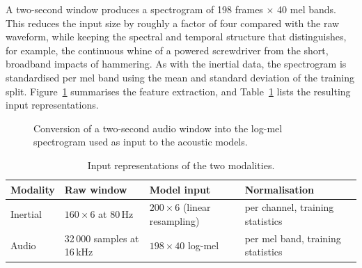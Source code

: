 A two-second window produces a spectrogram of 198 frames $\times$ 40 mel bands.
This reduces the input size by roughly a factor of four compared with the raw
waveform, while keeping the spectral and temporal structure that distinguishes,
for example, the continuous whine of a powered screwdriver from the short,
broadband impacts of hammering. As with the inertial data, the spectrogram is
standardised per mel band using the mean and standard deviation of the training
split. Figure~\ref{fig:logmel} summarises the feature extraction, and
Table~\ref{tab:inputs} lists the resulting input representations.

\begin{figure}[htbp]
\centering
{}
\caption{Conversion of a two-second audio window into the log-mel spectrogram used
as input to the acoustic models.}
\label{fig:logmel}
\end{figure}

\begin{table}[htbp]
\centering
\small
\renewcommand{\arraystretch}{1.2}
\begin{tabularx}{\textwidth}{|l|p{3.1cm}|p{3.3cm}|X|}
\hline
\textbf{Modality} & \textbf{Raw window} & \textbf{Model input} & \textbf{Normalisation} \\
\hline
Inertial & $160 \times 6$ at 80\,Hz & $200 \times 6$ (linear resampling) & per channel, training statistics \\
Audio & 32\,000 samples at 16\,kHz & $198 \times 40$ log-mel & per mel band, training statistics \\
\hline
\end{tabularx}
\caption{Input representations of the two modalities.}
\label{tab:inputs}
\end{table}

